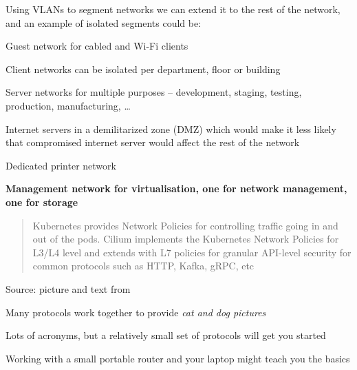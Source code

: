 \documentclass[Screen16to9,17pt]{foils}
\begin{document}
Using VLANs to segment networks we can extend it to the rest of the network, and an example of isolated segments could be:
\begin{list2}
\item Guest network for cabled and Wi-Fi clients
\item Client networks can be isolated per department, floor or building
\item Server networks for multiple purposes – development, staging, testing, production, manufacturing, …
\item Internet servers in a demilitarized zone (DMZ) which would make it less likely that compromised internet
server would affect the rest of the network
\item Dedicated printer network
\item \textbf{Management network for virtualisation, one for network management, one for storage}
\end{list2}




\begin{quote}
Kubernetes provides Network Policies for controlling traffic going in and out of the pods. Cilium implements the Kubernetes Network Policies for L3/L4 level and extends with L7 policies for granular API-level security for common protocols such as HTTP, Kafka, gRPC, etc
\end{quote}
Source: picture and text from 





\begin{list2}
\item Many protocols work together to provide \emph{cat and dog pictures}
\item Lots of acronyms, but a relatively small set of protocols will get you started
\item Working with a small portable router and your laptop might teach you the basics
\end{list2}

\myquestionspage
\end{document}

